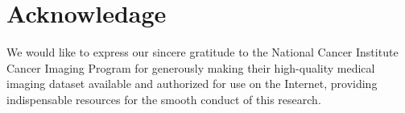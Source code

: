 \documentclass[twocolumn]{article}
\begin{document}
\section*{Acknowledage}
We would like to express our sincere gratitude to the National Cancer Institute Cancer Imaging Program for generously making their high-quality medical imaging dataset available and authorized for use on the Internet, providing indispensable resources for the smooth conduct of this research.



\end{document}
